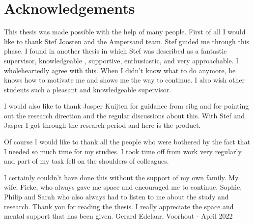 \newpage
\section{Acknowledgements} \label{acknowledgements}

This thesis was made possible with the help of many people.
First of all I would like to thank Stef Joosten and the Ampersand team.
Stef guided me through this phase.
I found in another thesis in which Stef was described as a fantastic supervisor, knowledgeable , supportive, enthusiastic, and very approachable.
I wholeheartedly agree with this.
When I didn't know what to do anymore, he knows how to motivate me and shows me the way to continue.
I also wish other students such a pleasant and knowledgeable supervisor.

I would also like to thank Jasper Kuijten for guidance from \acrshort{cibg} and for pointing out the research direction and the regular discussions about this.
With Stef and Jasper I got through the research period and here is the product.

Of course I would like to thank all the people who were bothered by the fact that I needed so much time for my studies.
I took time off from work very regularly and part of my task fell on the shoulders of colleagues.

I certainly couldn't have done this without the support of my own family.
My wife, Fieke, who always gave me space and encouraged me to continue.
Sophie, Philip and Sarah who also always had to listen to me about the study and research.
Thank you for reading the thesis.
I really appreciate the space and mental support that has been given.
\newline
\newline
\noindent
Gerard Edelaar, Voorhout - April 2022